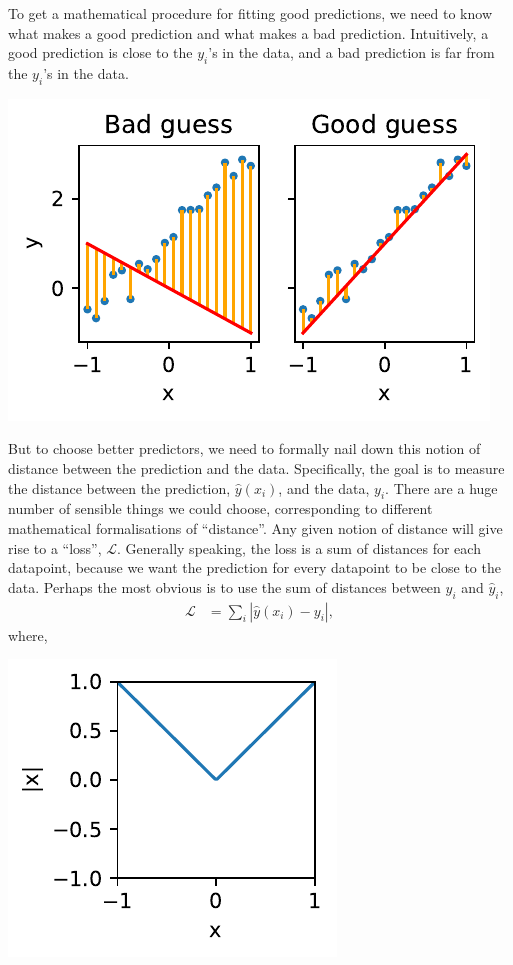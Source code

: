 \documentclass{article}
\newcommand{\yh}{\hat{y}}
\newcommand{\bracket}[3]{\left#1 #3 \right#2}
\newcommand{\abs}{\bracket{\lvert}{\rvert}}
\renewcommand{\L}{\mathcal{L}}
\begin{document}
To get a mathematical procedure for fitting good predictions, we need to know what makes a good prediction and what makes a bad prediction.
Intuitively, a good prediction is close to the $y_i$'s in the data, and a bad prediction is far from the $y_i$'s in the data.
\begin{center}
  \includegraphics{good_bad.pdf}
\end{center}
But to choose better predictors, we need to formally nail down this notion of distance between the prediction and the data.
Specifically, the goal is to measure the distance between the prediction, $\yh(x_i)$, and the data, $y_i$.
There are a huge number of sensible things we could choose, corresponding to different mathematical formalisations of ``distance''.
Any given notion of distance will give rise to a ``loss'', $\L$. 
Generally speaking, the loss is a sum of distances for each datapoint, because we want the prediction for every datapoint to be close to the data.
Perhaps the most obvious is to use the sum of distances between $y_i$ and $\yh_i$,
\begin{align}
  \L &= \sum_i \abs{\yh(x_i) - y_i},
\end{align}
where,
\begin{center}
  \includegraphics{abs.pdf}
\end{center}
\end{document}
